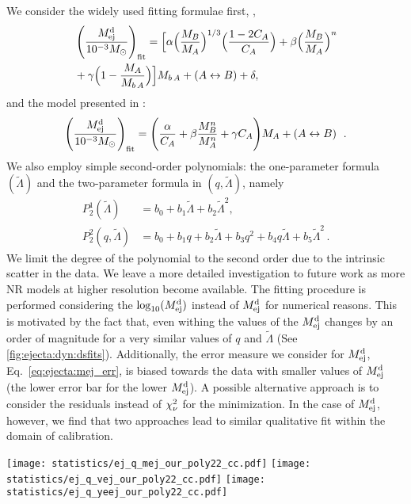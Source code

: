 We consider the widely used fitting formulae first, 
\citep{Kawaguchi:2016ana,Dietrich:2016fpt,Radice:2018pdn}, 
%
\begin{eqnarray}
\label{eq:fit_Mej}
&\left(\frac{M^{\text{d}}_{\text{ej}}}{10^{-3}M_{\odot}}\right)_{\rm fit} =
\Big[\alpha\Big(\frac{M_B}{M_A}\Big)^{1/3}\Big(\frac{1-2C_A}{C_A}\Big)+  
\beta\Big(\frac{M_B}{M_A}\Big)^n \\
&+ \gamma\Big(1-\frac{M_A}{M_{b\,A}} \Big)\Big]M_{b\,A} + (A\leftrightarrow B) + \delta\nonumber,
\end{eqnarray}
%
and the model presented in \citet{Kruger:2020gig}:
%
\begin{equation}
\label{eq:fit_Mej_Kruger}
\left(\frac{M^{\text{d}}_{\text{ej}}}{10^{-3}M_{\odot}}\right)_{\rm fit} =
\left(\frac{\alpha}{C_A} + \beta\frac{M_B ^n}{M_A ^n} + \gamma
C_A\Bigg)M_A + (A\leftrightarrow B)\right. \ .
\end{equation}
%
We also employ simple second-order polynomials: 
the one-parameter formula $(\tilde\Lambda)$ and the two-parameter
formula in $(q,\tilde\Lambda)$, namely
%
\begin{align}\label{eq:polyfit2}
P_2 ^1(\tilde{\Lambda}) &= b_0 + b_1\tilde\Lambda + b_2 \tilde\Lambda^2, \\\label{eq:polyfit22}
P_2 ^2(q,\tilde\Lambda) &= b_0 + b_1q + b_2\tilde\Lambda + b_3q ^2 +  b_4 q \tilde\Lambda + b_5\tilde\Lambda^2 \, .
\end{align}
%
We limit the degree of the polynomial to the second order due to the intrinsic 
scatter in the data. We leave a more detailed investigation to future work as 
more \ac{NR} models at higher resolution become available.
%
The fitting procedure is performed considering the $\log_{10}(M^{\text{d}}_{\text{ej}})$ instead of 
$M^{\text{d}}_{\text{ej}}$ for numerical reasons. This is motivated by the fact that, even withing 
\DSrefset{} the values of the $M^{\text{d}}_{\text{ej}}$ changes by an order of magnitude for a very 
similar values of $q$ and $\tilde{\Lambda}$ (See \ref{fig:ejecta:dyn:dsfits}).
%
Additionally, the error measure we consider for $M^{\text{d}}_{\text{ej}}$, Eq.~\eqref{eq:ejecta:mej_err}, 
is biased towards the data with smaller values of $M^{\text{d}}_{\text{ej}}$ (the lower error bar for the 
lower $M^{\text{d}}_{\text{ej}}$). A possible alternative approach is to consider the residuals instead of 
$\chi_{\nu}^2$ for the minimization. In the case of $M^{\text{d}}_{\text{ej}}$, however, we find that two 
approaches lead to similar qualitative fit within the domain of calibration.
%
\begin{figure*}[t]
    \centering 
    \texttt{[image: statistics/ej\_q\_mej\_our\_poly22\_cc.pdf]}
    \texttt{[image: statistics/ej\_q\_vej\_our\_poly22\_cc.pdf]}
    \texttt{[image: statistics/ej\_q\_yeej\_our\_poly22\_cc.pdf]}
    \caption{Dynamical ejecta properties as a function of mass ratio
        and reduced tidal parameter. The dependency on the latter is
        color coded. From left to right the main panels show the total
        mass, the mass-averaged velocity and the electron fraction.
        The bottom panels show the relative difference between the data
        and the fit polynomial fit discussed in the text.
        (Adapted from \citet{Nedora:2020pak})
    }
    \label{fig:ejecta:dyn:dsfits}
\end{figure*}
